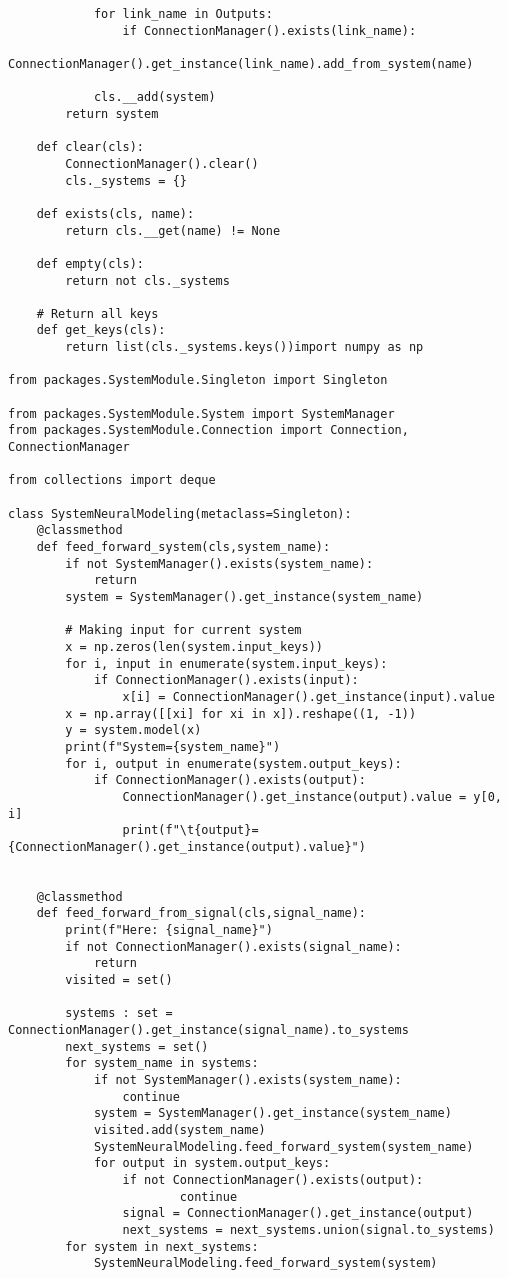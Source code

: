 {\begin{lstlisting}
            for link_name in Outputs:
                if ConnectionManager().exists(link_name):
                    ConnectionManager().get_instance(link_name).add_from_system(name)
            
            cls.__add(system)
        return system
    
    def clear(cls):
        ConnectionManager().clear()
        cls._systems = {}
    
    def exists(cls, name):
        return cls.__get(name) != None
    
    def empty(cls):
        return not cls._systems
    
    # Return all keys
    def get_keys(cls):
        return list(cls._systems.keys())import numpy as np

from packages.SystemModule.Singleton import Singleton

from packages.SystemModule.System import SystemManager
from packages.SystemModule.Connection import Connection, ConnectionManager

from collections import deque

class SystemNeuralModeling(metaclass=Singleton):
    @classmethod
    def feed_forward_system(cls,system_name):
        if not SystemManager().exists(system_name):
            return
        system = SystemManager().get_instance(system_name)
            
        # Making input for current system
        x = np.zeros(len(system.input_keys))
        for i, input in enumerate(system.input_keys):
            if ConnectionManager().exists(input):
                x[i] = ConnectionManager().get_instance(input).value
        x = np.array([[xi] for xi in x]).reshape((1, -1))
        y = system.model(x)
        print(f"System={system_name}")
        for i, output in enumerate(system.output_keys):
            if ConnectionManager().exists(output):
                ConnectionManager().get_instance(output).value = y[0, i]
                print(f"\t{output}={ConnectionManager().get_instance(output).value}")
    
    
    @classmethod
    def feed_forward_from_signal(cls,signal_name):
        print(f"Here: {signal_name}")
        if not ConnectionManager().exists(signal_name):
            return
        visited = set()
        
        systems : set = ConnectionManager().get_instance(signal_name).to_systems
        next_systems = set()
        for system_name in systems:
            if not SystemManager().exists(system_name):
                continue
            system = SystemManager().get_instance(system_name)
            visited.add(system_name)
            SystemNeuralModeling.feed_forward_system(system_name)
            for output in system.output_keys:
                if not ConnectionManager().exists(output):
                        continue
                signal = ConnectionManager().get_instance(output)
                next_systems = next_systems.union(signal.to_systems)
        for system in next_systems:
            SystemNeuralModeling.feed_forward_system(system)
    

\end{lstlisting}}

